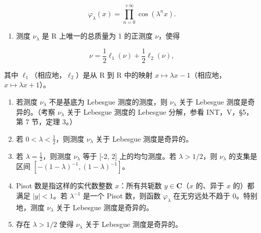 \[
\varphi_ {\lambda} (x) = \prod_ {n = 0} ^ {+ \infty} \cos (\lambda^ {n} x).
\]

\begin{enumerate}
\def\labelenumi{\alph{enumi})}
\setcounter{enumi}{1}
\tightlist
\item
  测度 \(\nu_{\lambda}\) 是 R 上唯一的总质量为 1 的正测度 \(\nu\)，使得
\end{enumerate}

\[
\nu = \frac {1}{2} \ell_ {1} (\nu) + \frac {1}{2} \ell_ {2} (\nu),
\]

其中 \(\ell_{1}\)（相应地，\(\ell_{2}\)）是从 R 到 R 中的映射 \(x \mapsto \lambda x - 1\)（相应地，\(x \mapsto \lambda x + 1\)）。

\begin{enumerate}
\def\labelenumi{\alph{enumi})}
\setcounter{enumi}{2}
\item
  若测度 \(\nu_{\lambda}\) 不是基底为 Lebesgue 测度的测度，则 \(\nu_{\lambda}\) 关于 Lebesgue 测度是奇异的。（考察 \(\nu_{\lambda}\) 关于 Lebesgue 测度的 Lebesgue 分解，参看 INT，V，§5，第 7 节，定理 3。）
\item
  若 \(0 < \lambda < \frac{1}{2}\)，则测度 \(\nu_{\lambda}\) 关于 Lebesgue 测度是奇异的。
\item
  若 \(\lambda = \frac{1}{2}\)，则测度 \(\nu_{\lambda}\) 等于 {[}-2, 2{]} 上的均匀测度。若 \(\lambda > 1/2\)，则 \(\nu_{\lambda}\) 的支集是区间 \([-(1-\lambda)^{-1}, (1-\lambda)^{-1}]\)。
\item
  Pisot 数是指这样的实代数整数 \(x\)：所有共轭数 \(y \in \mathbf{C}\)（\(x\) 的、异于 \(x\) 的）都满足 \(|y| < 1\)。若 \(\lambda^{-1}\) 是一个 Pisot 数，则函数 \(\varphi_{\lambda}\) 在无穷远处不趋于 0。特别地，测度 \(\nu_{\lambda}\) 关于 Lebesgue 测度是奇异的。
\item
  存在 \(\lambda > 1/2\) 使得 \(\nu_{\lambda}\) 关于 Lebesgue 测度是奇异的。
\end{enumerate}
